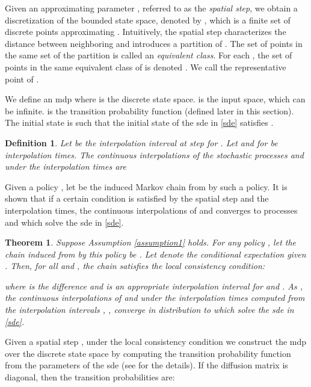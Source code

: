 \documentclass[letterpaper, 10 pt, conference]{ieeeconf}
\newtheorem{definition}{Definition}
\newtheorem{theorem}{Theorem}
\begin{document}
Given an approximating parameter , referred to as the \emph{spatial
  step}, we obtain a discretization of the bounded state space,
denoted by , which is a finite set of discrete points
approximating . Intuitively, the spatial step  characterizes the
distance between neighboring and introduces a partition of . The
set of points in the same set of the partition is called an
\emph{equivalent class}.  For each , the set of points in
the same equivalent class of  is denoted
.  We call  the
representative point of . 




We define an \ac{mdp}  where
 is the discrete state space.  is the input space, which can
be infinite.   is the
transition probability function (defined later in this section).  The
initial state is  such that the initial state  of
the \ac{sde} in \eqref{sde} satisfies .

\begin{definition} \cite{kushner2001numerical} Let  be
  the interpolation interval at step  for . Let 
  and  for  be
  interpolation times.  The \emph{continuous interpolations}
   of the stochastic processes
   and  under the
  interpolation times  are
  
\end{definition}

Given a policy , let  be the
induced Markov chain from  by such a policy.  It is shown that if
a certain condition is satisfied by the spatial step and the
interpolation times, the continuous interpolations of
 and  converges to processes
 and  which solve the \ac{sde} in \eqref{sde}.




\begin{theorem}
\label{thm:stateconverge}
\cite{kushner2001numerical} Suppose Assumption \ref{assumption1}
holds.  For any policy , let the chain induced from
 by this policy be .  Let 
denote the conditional expectation given
. Then, for all
 and , the chain  satisfies the
\emph{local consistency condition}:
  
where  is the difference and
 is an appropriate interpolation interval for
 and .  As , the continuous
interpolations  of 
and  under the interpolation times
 computed from the interpolation intervals
, , converge in distribution to
 which solve the \ac{sde} in
\eqref{sde}.\end{theorem}





Given a spatial step , under the local consistency condition we
construct the \ac{mdp}  over the discrete state space  by
computing the transition probability function  from the
parameters of the \ac{sde} (see \cite{kushner2001numerical} for the
details). If the diffusion matrix  is diagonal, then the
transition probabilities are:
\end{document}
